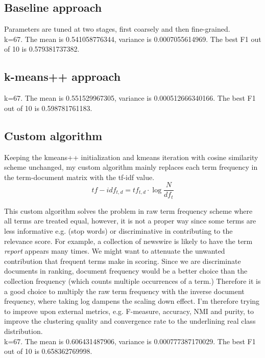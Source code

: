 \documentclass{article}
\begin{document}
\subsection{Baseline approach}
Parameters are tuned at two stages, first coarsely and then fine-grained.  \\

k=67. The mean is 0.541058776344, variance is 0.0007055614969. The best F1 out of 10 is 0.579381737382.\\
\subsection{k-means++ approach}
k=67. The mean is 0.551529967305, variance is 0.000512666340166. The best F1 out of 10 is 0.598781761183. \\

\subsection{Custom algorithm}
Keeping the kmeans++ initialization and kmeans iteration with cosine similarity scheme unchanged, my custom algorithm mainly replaces each term frequency in the term-document matrix with the tf-idf value.  
\[ tf-idf_{t,d} = tf_{t,d} \cdot \log \frac{N}{df_t}\]

This custom algorithm solves the problem in raw term frequency scheme where all terms are treated equal, however, it is not a proper way since some terms are less informative e.g. (stop words) or discriminative in contributing to the relevance score. For example, a collection of newswire is likely to have the term \textit{report} appears many times. We might want to attenuate the unwanted contribution that frequent terms make in scoring. Since we are discriminate documents in ranking, document frequency would be a better choice than the collection frequency (which counts multiple occurrences of a term.) Therefore it is a good choice to multiply the raw term frequency with the inverse document frequency, where taking log dampens the scaling down effect. I'm therefore trying to improve upon external metrics, e.g. F-measure, accuracy, NMI and purity, to improve the clustering quality and convergence rate to the underlining real class distribution. \\

k=67. The mean is 0.606431487906, variance is 0.000777387170029. The best F1 out of 10 is 0.658362769998.\\
\end{document}
